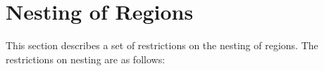 %
%
%
%
%
%
%
%
%
%
%
%
%


\section{Nesting of Regions}
\label{sec:Nesting of Regions}
This section describes a set of restrictions on the nesting of regions. The restrictions on
nesting are as follows:

